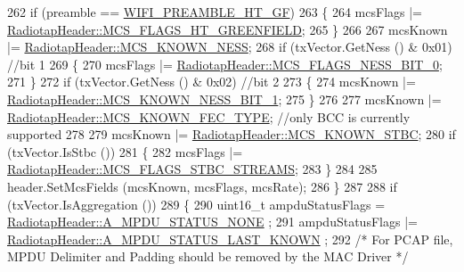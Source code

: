 \begin{DoxyCode}
262             \textcolor{keywordflow}{if} (preamble == \hyperlink{group__wifi_gga5e94a56cb338a14ffbbb19c6a41251eba82e0b00d79c1f01b7a6e46b693bafd72}{WIFI\_PREAMBLE\_HT\_GF})
263               \{
264                 mcsFlags |= \hyperlink{classns3_1_1RadiotapHeader_a81a58a7c4281df7ce21fb72c5ed181c3ac8c45b1a0c60f92bf2f424f46373c87c}{RadiotapHeader::MCS\_FLAGS\_HT\_GREENFIELD};
265               \}
266 
267             mcsKnown |= \hyperlink{classns3_1_1RadiotapHeader_aac7ef91c429fa95640a0e3a996b6741da96922c704ba99acf6c306c79f89f02ff}{RadiotapHeader::MCS\_KNOWN\_NESS};
268             \textcolor{keywordflow}{if} (txVector.GetNess () & 0x01) \textcolor{comment}{//bit 1}
269               \{
270                 mcsFlags |= \hyperlink{classns3_1_1RadiotapHeader_a81a58a7c4281df7ce21fb72c5ed181c3a423ea5081ba934fb09932a665e19328e}{RadiotapHeader::MCS\_FLAGS\_NESS\_BIT\_0};
271               \}
272             \textcolor{keywordflow}{if} (txVector.GetNess () & 0x02) \textcolor{comment}{//bit 2}
273               \{
274                 mcsKnown |= \hyperlink{classns3_1_1RadiotapHeader_aac7ef91c429fa95640a0e3a996b6741da84245044e52f4f408a0001fb908caefa}{RadiotapHeader::MCS\_KNOWN\_NESS\_BIT\_1};
275               \}
276 
277             mcsKnown |= \hyperlink{classns3_1_1RadiotapHeader_aac7ef91c429fa95640a0e3a996b6741da15967fe34f7c63675c058d2832524c95}{RadiotapHeader::MCS\_KNOWN\_FEC\_TYPE}; \textcolor{comment}{//only BCC is
       currently supported}
278 
279             mcsKnown |= \hyperlink{classns3_1_1RadiotapHeader_aac7ef91c429fa95640a0e3a996b6741dafe3d106f243f1230cedd23df369445f9}{RadiotapHeader::MCS\_KNOWN\_STBC};
280             \textcolor{keywordflow}{if} (txVector.IsStbc ())
281               \{
282                 mcsFlags |= \hyperlink{classns3_1_1RadiotapHeader_a81a58a7c4281df7ce21fb72c5ed181c3a9d8a68f5220ee2e53e48ebb9f140103b}{RadiotapHeader::MCS\_FLAGS\_STBC\_STREAMS};
283               \}
284 
285             header.SetMcsFields (mcsKnown, mcsFlags, mcsRate);
286           \}
287 
288         \textcolor{keywordflow}{if} (txVector.IsAggregation ())
289           \{
290             uint16\_t ampduStatusFlags = \hyperlink{classns3_1_1RadiotapHeader_a9f8333ba19c8dc9ae63e7e03af87a557a223cc9f40442a69cce17a841b7c750dc}{RadiotapHeader::A\_MPDU\_STATUS\_NONE}
      ;
291             ampduStatusFlags |= \hyperlink{classns3_1_1RadiotapHeader_a9f8333ba19c8dc9ae63e7e03af87a557ad9c553bb630ebec01fc4cfe8ff68ec9a}{RadiotapHeader::A\_MPDU\_STATUS\_LAST\_KNOWN}
      ;
292             \textcolor{comment}{/* For PCAP file, MPDU Delimiter and Padding should be removed by the MAC Driver */}

\end{DoxyCode}

